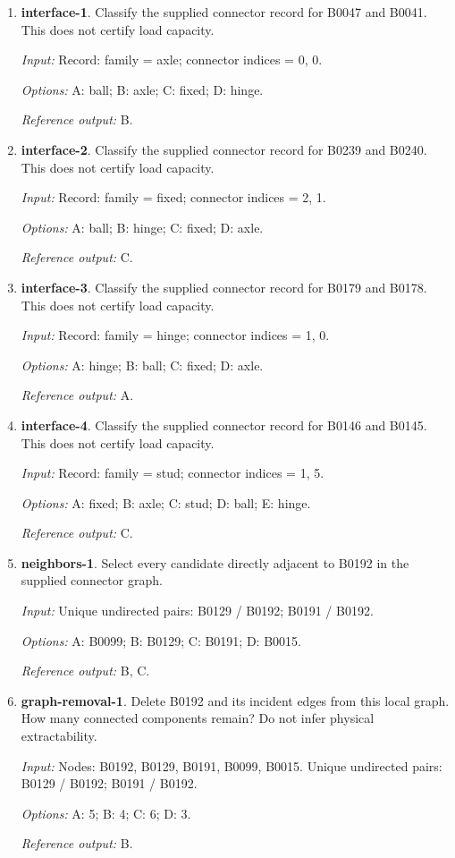 \begin{enumerate}
\item \textbf{interface-1}. Classify the supplied connector record for B0047 and B0041. This does not certify load capacity.\par {\small \textit{Input:} Record: family = axle; connector indices = 0, 0. \par\textit{Options:} A: ball; B: axle; C: fixed; D: hinge. \par\textit{Reference output:} B.}
\item \textbf{interface-2}. Classify the supplied connector record for B0239 and B0240. This does not certify load capacity.\par {\small \textit{Input:} Record: family = fixed; connector indices = 2, 1. \par\textit{Options:} A: ball; B: hinge; C: fixed; D: axle. \par\textit{Reference output:} C.}
\item \textbf{interface-3}. Classify the supplied connector record for B0179 and B0178. This does not certify load capacity.\par {\small \textit{Input:} Record: family = hinge; connector indices = 1, 0. \par\textit{Options:} A: hinge; B: ball; C: fixed; D: axle. \par\textit{Reference output:} A.}
\item \textbf{interface-4}. Classify the supplied connector record for B0146 and B0145. This does not certify load capacity.\par {\small \textit{Input:} Record: family = stud; connector indices = 1, 5. \par\textit{Options:} A: fixed; B: axle; C: stud; D: ball; E: hinge. \par\textit{Reference output:} C.}
\item \textbf{neighbors-1}. Select every candidate directly adjacent to B0192 in the supplied connector graph.\par {\small \textit{Input:} Unique undirected pairs: B0129 / B0192; B0191 / B0192. \par\textit{Options:} A: B0099; B: B0129; C: B0191; D: B0015. \par\textit{Reference output:} B, C.}
\item \textbf{graph-removal-1}. Delete B0192 and its incident edges from this local graph. How many connected components remain? Do not infer physical extractability.\par {\small \textit{Input:} Nodes: B0192, B0129, B0191, B0099, B0015. Unique undirected pairs: B0129 / B0192; B0191 / B0192. \par\textit{Options:} A: 5; B: 4; C: 6; D: 3. \par\textit{Reference output:} B.}

\end{enumerate}
